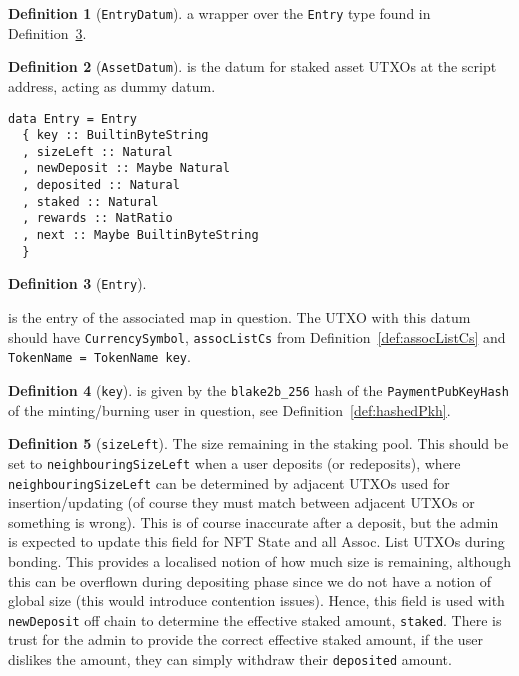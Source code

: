\documentclass[10pt, a4paper]{article}
\theoremstyle{definition}
\newtheorem{definition}{Definition}[section]
\begin{document}
\begin{definition}[\texttt{EntryDatum}]\label{def:EntryDatum} a wrapper over the \texttt{Entry} type found in Definition~\ref{def:Entry}.
\end{definition}

\begin{definition}[\texttt{AssetDatum}]\label{def:AssetDatum} is the datum for staked asset UTXOs at the script address, acting as dummy datum.
\end{definition}

\begin{verbatim}
data Entry = Entry
  { key :: BuiltinByteString
  , sizeLeft :: Natural
  , newDeposit :: Maybe Natural
  , deposited :: Natural
  , staked :: Natural
  , rewards :: NatRatio
  , next :: Maybe BuiltinByteString
  }
\end{verbatim}
\begin{definition}[\texttt{Entry}]\label{def:Entry}
\end{definition} is the entry of the associated map in question. The UTXO with this datum should have \texttt{CurrencySymbol},  \texttt{assocListCs} from Definition~\ref{def:assocListCs} and \texttt{TokenName = TokenName key}.

\begin{definition}[\texttt{key}]\label{def:key}
is given by the \texttt{blake2b\_256} hash of the \texttt{PaymentPubKeyHash} of the minting/burning user in question, see Definition~\ref{def:hashedPkh}. 
\end{definition}

\begin{definition}[\texttt{sizeLeft}]\label{def:sizeLeft}
The size remaining in the staking pool. This should be set to \texttt{neighbouringSizeLeft} when a user deposits (or redeposits), where \texttt{neighbouringSizeLeft} can be determined by adjacent UTXOs used for insertion/updating (of course they must match between adjacent UTXOs or something is wrong). This is of course inaccurate after a deposit, but the admin is expected to update this field for NFT State and all Assoc. List UTXOs during bonding.  This provides a localised notion of how much size is remaining, although this can be overflown during depositing phase since we do not have a notion of global size (this would introduce contention issues). Hence, this field is used with \texttt{newDeposit} off chain to determine the effective staked amount, \texttt{staked}. There is trust for the admin to provide the correct effective staked amount, if the user dislikes the amount, they can simply withdraw their \texttt{deposited} amount.
\end{definition}
\end{document}
